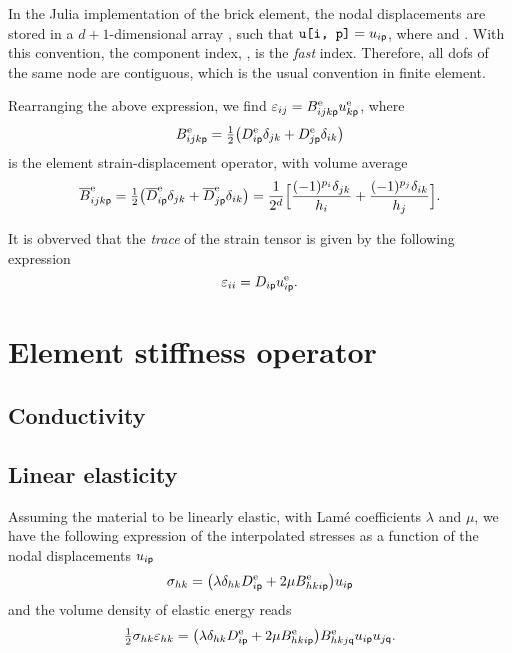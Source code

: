 \begin{remark}
  In the Julia implementation of the brick element, the nodal displacements are
  stored in a \(d+1\)-dimensional array , such that
  \(\text{\texttt{u[i, p]}}=u_{i\mathsf{p}}\), where  and
  . With this convention, the
  component index, , is the \emph{fast} index. Therefore, all dofs of
  the same node are contiguous, which is the usual convention in finite element.
\end{remark}

Rearranging the above expression, we find
\(\varepsilon_{ij}=B^{\mathrm{e}}_{ijk\mathsf{p}}u_{k\mathsf{p}}^{\mathrm{e}}\), where
\begin{equation}
  B_{ijk\mathsf{p}}^{\mathrm{e}}
  =\tfrac12\bigl(D^{\mathrm{e}}_{i\mathsf{p}}\delta_{jk}
  +D^{\mathrm{e}}_{j\mathsf{p}}\delta_{ik}\bigr)
\end{equation}
is the element strain-displacement operator, with volume average
\begin{equation}
  \overline{B}_{ijk\mathsf{p}}^{\mathrm{e}}
  =\tfrac12\bigl(\overline{D}^{\mathrm{e}}_{i\mathsf{p}}\delta_{jk}
  +\overline{D}^{\mathrm{e}}_{j\mathsf{p}}\delta_{ik}\bigr)
  =\frac1{2^d}\Bigl[\frac{(-1)^{p_i}\delta_{jk}}{h_i}
  +\frac{(-1)^{p_j}\delta_{ik}}{h_j}\Bigr].
\end{equation}

It is obverved that the \emph{trace} of the strain tensor is given by the
following expression
\begin{equation}
  \varepsilon_{ii}=D_{i\mathsf{p}}u_{i\mathsf{p}}^{\mathrm{e}}.
\end{equation}

\section{Element stiffness operator}

\subsection{Conductivity}

\subsection{Linear elasticity}
\label{sec:20210930054950}

Assuming the material to be linearly elastic, with Lamé coefficients \(\lambda\)
and \(\mu\), we have the following expression of the interpolated stresses as a
function of the nodal displacements \(u_{i\mathsf{p}}\)
\begin{equation}
  \sigma_{hk}=\bigl(\lambda\delta_{hk} D^{\mathrm{e}}_{i\mathsf{p}}
  +2\mu B^{\mathrm{e}}_{hki\mathsf{p}}\bigr)u_{i\mathsf{p}}
\end{equation}
and the volume density of elastic energy reads
\begin{equation}
  \tfrac12\sigma_{hk}\varepsilon_{hk}
  =\bigl(\lambda\delta_{hk} D^{\mathrm{e}}_{i\mathsf{p}}
  +2\mu B^{\mathrm{e}}_{hki\mathsf{p}}\bigr)B_{hkj\mathsf{q}}^{\mathrm{e}}
  u_{i\mathsf{p}}u_{j\mathsf{q}}.
\end{equation}

